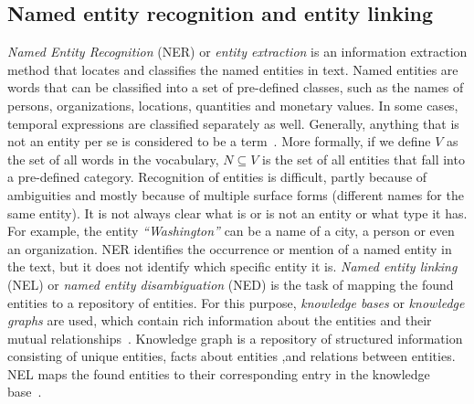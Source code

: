\subsection{Named entity recognition and  entity linking}\label{subsec:entity_recog}
\emph{Named Entity Recognition} (NER)  or \emph{entity extraction} is an information extraction method that locates and classifies the named entities in text. Named entities are words that can be classified into a set of pre-defined classes, such as the names of persons, organizations, locations, quantities and monetary values. In some cases, temporal expressions are classified separately as well. Generally, anything that is not an entity per se is considered to be a term~. More formally, if we define $V$ as the set of all words in the vocabulary, $N\subseteq V$ is the set of all entities that fall into a pre-defined category.
Recognition of entities is difficult, partly because of ambiguities and mostly because of multiple surface forms (different names for the same entity).
It is not always clear what is or is not an entity or what type it has. For example, the entity \emph{``Washington''} can be a name of a city, a person or even an organization. NER identifies the occurrence or mention of a named entity in the text, but it does not identify which specific entity it is. \emph{Named entity linking} (NEL) or \emph{named entity disambiguation} (NED) is the task of mapping the found entities to a repository of entities. For this purpose, \emph{knowledge bases} or \emph{knowledge graphs} are used, which contain rich information about the entities and their mutual relationships~. Knowledge graph is a repository of structured information consisting of unique entities, facts about entities ,and relations between entities. NEL maps the found entities to their corresponding entry in the knowledge base~. 
